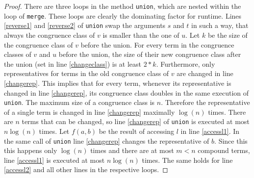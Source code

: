 \begin{proof}

There are three loops in the method \texttt{union}, which are nested within the loop of \texttt{merge}.
These loops are clearly the dominating factor for runtime.
Lines \ref{reverse1} and \ref{reverse2} of \texttt{union} swap the arguments $s$ and $t$ in such a way, that always the congruence class of $v$ is smaller than the one of $u$.
Let $k$ be the size of the congruence class of $v$ before the union.
For every term in the congruence classes of $v$ and $u$ before the union, the size of their new congruence class after the union (set in line \ref{changeclass}) is at least $2*k$.
Furthermore, only representatives for terms in the old congruence class of $v$ are changed in line \ref{changerep}.
This implies that for every term, whenever its representative is changed in line \ref{changerep}, its congruence class doubles in the same execution of \texttt{union}.
The maximum size of a congruence class is $n$.
Therefore the representative of a single term is changed in line \ref{changerep} maximally $\log(n)$ times.
There are $n$ terms that can be changed, so line \ref{changerep} of \texttt{union} is executed at most $n \log(n)$ times.
Let $f(a,b)$ be the result of accessing $l$ in line \ref{accessl1}.
In the same call of \texttt{union} line \ref{changerep} changes the representative of $b$.
Since this this happens only $\log(n)$ times and there are at most $m < n$ compound terms, line \ref{accessl1} is executed at most $n \log(n)$ times.
The same holds for line \ref{accessl2} and all other lines in the respective loops.

\end{proof}


\FloatBarrier

